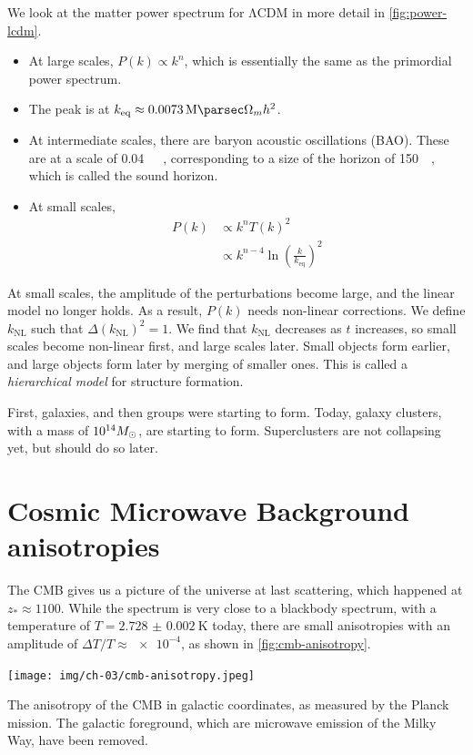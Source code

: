 We look at the matter power spectrum for ΛCDM in more detail in \cref{fig:power-lcdm}. 
\begin{itemize}
	\item At large scales, $P(k) \propto k^n$, which is essentially the same as the primordial power spectrum.
	\item The peak is at $k_\text{eq} \approx \SI{0.0073}{\per\mega\parsec} \Omega_m h^2$.
	\item At intermediate scales, there are baryon acoustic oscillations (BAO). These are at a scale of \SI{0.04}{\per\mega\parsec}, corresponding to a size of the horizon of \SI{150}{\mega\parsec}, which is called the sound horizon.
	\item At small scales,
	\begin{align*}
		P(k)
		&\propto k^n T(k)^2\\
		&\propto k^{n-4} \ln
		\left( \frac{k}{k_\text{eq}} \right)^2
	\end{align*}
\end{itemize}
At small scales, the amplitude of the perturbations become large, and the linear model no longer holds. As a result, $P(k)$ needs non-linear corrections. We define $k_\text{NL}$ such that $\Delta(k_\text{NL})^2 = 1$. We find that $k_\text{NL}$ decreases as $t$ increases, so small scales become non-linear first, and large scales later. Small objects form earlier, and large objects form later by merging of smaller ones. This is called a \emph{hierarchical model} for structure formation.
 
First, galaxies, and then groups were starting to form.
Today, galaxy clusters, with a mass of $\num{e14} M_\odot$, are starting to form.
Superclusters are not collapsing yet, but should do so later.






\section{Cosmic Microwave Background anisotropies}
The CMB gives us a picture of the universe at last scattering, which happened at $z_* \approx \num{1100}$. While the spectrum is very close to a blackbody spectrum, with a temperature of $T = \SI{2.728(2)}{\kelvin}$ today, there are small anisotropies with an amplitude of $\Delta T / T \approx \num{e-4}$, as shown in \cref{fig:cmb-anisotropy}.

\begin{marginfigure}
	\centering
	\texttt{[image: img/ch-03/cmb-anisotropy.jpeg]}
	\caption{The anisotropy of the CMB in galactic coordinates, as measured by the Planck mission. The galactic foreground, which are microwave emission of the Milky Way, have been removed.}
	\label{fig:cmb-anisotropy}
\end{marginfigure}

